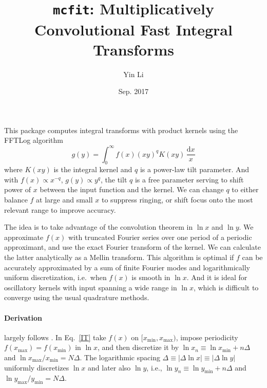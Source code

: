 \documentclass{article}
\renewcommand{\d}{\mathrm{d}}
\newcommand{\xmin}{x_\mathrm{min}}
\newcommand{\xmax}{x_\mathrm{max}}
\newcommand{\ymin}{y_\mathrm{min}}
\newcommand{\ymax}{y_\mathrm{max}}
\begin{document}
\title{\texttt{mcfit}: Multiplicatively Convolutional Fast Integral Transforms}
\author{Yin Li}
\date{Sep. 2017}
\maketitle


This package computes integral transforms with product kernels
using the FFTLog algorithm \cite{Talman78,Hamilton00}
\begin{equation}
    \label{IT}
    g(y) = \int_0^\infty f(x) (xy)^q K(xy) \,\frac{\d x}x
\end{equation}
where $K(xy)$ is the integral kernel and $q$ is a power-law tilt parameter.
And with $f(x)\propto x^{-q}$, $g(y)\propto y^q$, the tilt $q$ is a free
parameter serving to shift power of $x$ between the input function and the
kernel.
We can change $q$ to either balance $f$ at large and small $x$ to suppress
ringing, or shift focus onto the most relevant range to improve accuracy.

The idea is to take advantage of the convolution theorem in $\ln x$ and $\ln y$.
We approximate $f(x)$ with truncated Fourier series over one period of a
periodic approximant, and use the exact Fourier transform of the kernel.
We can calculate the latter analytically as a Mellin transform.
This algorithm is optimal if $f$ can be accurately approximated by a sum of
finite Fourier modes and logarithmically uniform discretization, i.e.\ when
$f(x)$ is smooth in $\ln x$.
And it is ideal for oscillatory kernels with input spanning a wide range in
$\ln x$, which is difficult to converge using the usual quadrature methods.


\paragraph{Derivation} largely follows \cite{Hamilton00}.
In Eq.~\eqref{IT} take $f(x)$ on $[\xmin, \xmax)$, impose periodicity
$f(\xmax)=f(\xmin)$ in $\ln x$, and then discretize it by
$\ln x_n\equiv\ln\xmin+n\Delta$ and $\ln\xmax/\xmin=N\Delta$.
The logarithmic spacing $\Delta\equiv|\Delta\ln x|\equiv|\Delta\ln y|$
uniformly discretizes $\ln x$ and later also $\ln y$,
i.e., $\ln y_n\equiv\ln\ymin+n\Delta$ and $\ln\ymax/\ymin=N\Delta$.
\end{document}
